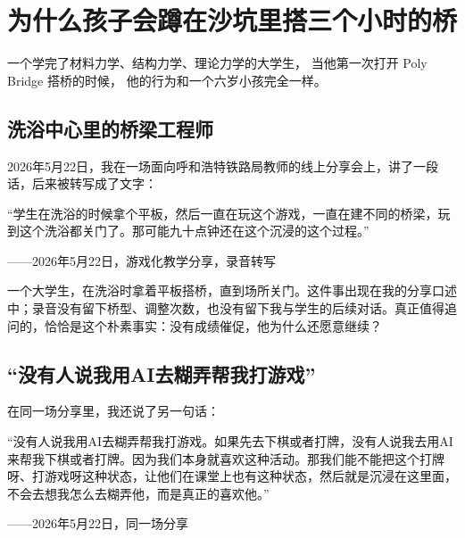 
\chapter{为什么孩子会蹲在沙坑里搭三个小时的桥}

\vspace{0.5cm}

\begin{center}
{\small\color{muted} 一个学完了材料力学、结构力学、理论力学的大学生，}
{\small\color{muted} 当他第一次打开 Poly Bridge 搭桥的时候，}
{\small\color{muted} 他的行为和一个六岁小孩完全一样。}
\end{center}

\vspace{1cm}

\section{洗浴中心里的桥梁工程师}

2026年5月22日，我在一场面向呼和浩特铁路局教师的线上分享会上，讲了一段话，后来被转写成了文字：

\begin{shiyu-inline}
``学生在洗浴的时候拿个平板，然后一直在玩这个游戏，一直在建不同的桥梁，玩到这个洗浴都关门了。那可能九十点钟还在这个沉浸的这个过程。''

\hfill ——2026年5月22日，游戏化教学分享，录音转写
\end{shiyu-inline}

一个大学生，在洗浴时拿着平板搭桥，直到场所关门。这件事出现在我的分享口述中；录音没有留下桥型、调整次数，也没有留下我与学生的后续对话。真正值得追问的，恰恰是这个朴素事实：没有成绩催促，他为什么还愿意继续？

\section{``没有人说我用AI去糊弄帮我打游戏''}

在同一场分享里，我还说了另一句话：

\begin{shiyu-inline}
``没有人说我用AI去糊弄帮我打游戏。如果先去下棋或者打牌，没有人说我去用AI来帮我下棋或者打牌。因为我们本身就喜欢这种活动。那我们能不能把这个打牌呀、打游戏呀这种状态，让他们在课堂上也有这种状态，然后就是沉浸在这里面，不会去想我怎么去糊弄他，而是真正的喜欢他。''

\hfill ——2026年5月22日，同一场分享
\end{shiyu-inline}

